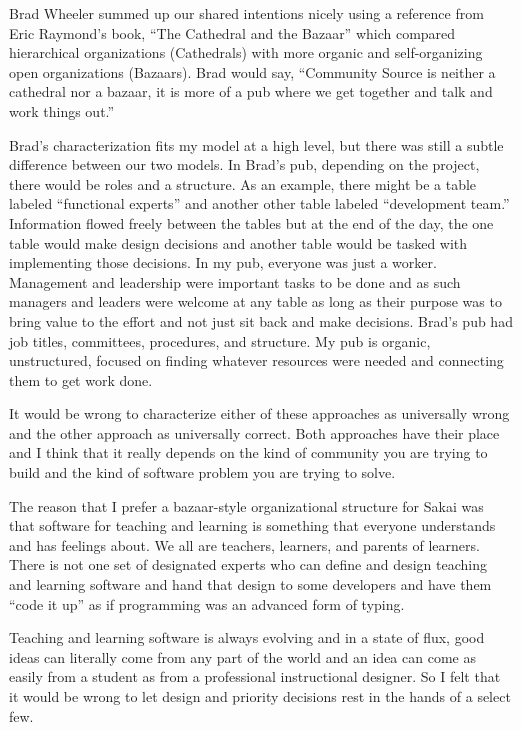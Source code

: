\documentclass[12pt]{book}
\begin{document}
Brad Wheeler summed up our shared intentions nicely using a reference from Eric
Raymond's book, ``The Cathedral and the Bazaar'' which compared
hierarchical organizations (Cathedrals) with more organic and self-organizing
open organizations (Bazaars).  Brad would say, ``Community Source is neither
a cathedral nor a bazaar, it is more of a pub where we get together and talk
and work things out.''

Brad's characterization fits my model at a high level, but there was still a
subtle difference between our two models.
In Brad's pub, depending on the project, there would be roles
and a structure.  As an example, there might be a table
labeled ``functional experts'' and another other table labeled
``development team.''  Information
flowed freely between the tables but at the end of the day,
the one table would make design decisions and another table would be tasked
with implementing those decisions.
In my pub, everyone was just a worker.  Management and
leadership were important tasks to be done and as such managers and
leaders were welcome at any table as long as
their purpose was to bring value to the effort and not just sit back
and make decisions.
Brad's pub had job titles, committees, procedures, and structure.
My pub is organic,
unstructured, focused on finding whatever resources were needed and
connecting them to get work done.

It would be wrong to characterize either of these approaches
as universally wrong and the other approach as universally correct.
Both approaches have their place and I think that it really depends on
the kind of community you are trying to build and the kind of software
problem you are trying to solve.

The reason that I prefer a bazaar-style organizational structure for
Sakai was that software for teaching and learning is something that
everyone understands and has feelings about.   We all are teachers,
learners, and parents of learners.   There is not one set
of designated experts who can define and design teaching and
learning software and hand that design to some developers and
have them ``code it up'' as if programming was an advanced form of typing.

Teaching and learning software is always evolving and in a state
of flux, good ideas can literally come from any part of the
world and an idea can come as easily from a student as from a professional
instructional designer.   So I felt that it would be
wrong to let design and priority decisions rest in the hands of a select few.
\end{document}
